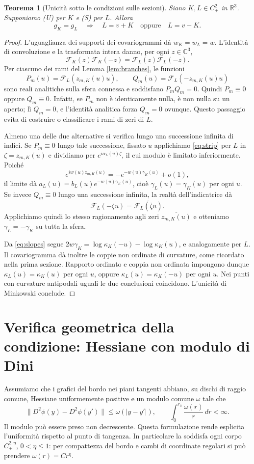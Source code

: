 \documentclass[11pt,a4paper]{article}
\newtheorem{theorem}{Teorema}
\theoremstyle{remark}
\newcommand{\R}{\mathbb R}
\begin{document}
\begin{theorem}[Unicità sotto le condizioni sulle sezioni]\label{thm:sectionunique}
Siano $K,L\in C^2_+$ in $\R^3$. Supponiamo (U) per $K$ e (S) per $L$.
Allora
\[
g_K=g_L\quad\Longrightarrow\quad L=v+K\quad\text{oppure}\quad L=v-K.
\]
\end{theorem}
\begin{proof}
L'uguaglianza dei supporti dei covariogrammi dà $w_K=w_L=w$.
L'identità di convoluzione e la trasformata intera danno, per ogni
$z\in\mathbb C^3$,
\[
\mathcal F_K(z)\mathcal F_K(-z)=\mathcal F_L(z)\mathcal F_L(-z).
\]
Per ciascuno dei rami del Lemma \ref{lem:branches}, le funzioni
\[
P_m(u)=\mathcal F_L(z_{m,K}(u)u),\qquad
Q_m(u)=\mathcal F_L(-z_{m,K}(u)u)
\]
sono reali analitiche sulla sfera connessa e soddisfano $P_mQ_m=0$.
Quindi $P_m\equiv0$ oppure $Q_m\equiv0$. Infatti, se $P_m$ non è
identicamente nulla, è non nulla su un aperto; lì $Q_m=0$, e l'identità
analitica forza $Q_m=0$ ovunque. Questo passaggio evita di costruire o
classificare i rami di zeri di $L$.

Almeno una delle due alternative si verifica lungo una successione
infinita di indici. Se $P_m\equiv0$ lungo tale successione, fissato $u$
applichiamo \eqref{eq:strip} per $L$ in $\zeta=z_{m,K}(u)$ e dividiamo
per $e^{i\alpha_L(u)\zeta}$, il cui modulo è limitato inferiormente.
Poiché
\[
e^{iw(u)z_{m,K}(u)}=-e^{-w(u)\gamma_K(u)}+o(1),
\]
il limite dà $a_L(u)=b_L(u)e^{-w(u)\gamma_K(u)}$, cioè
$\gamma_L(u)=\gamma_K(u)$ per ogni $u$.
Se invece $Q_m\equiv0$ lungo una successione infinita, la realtà
dell'indicatrice dà
\[
\mathcal F_L(-\zeta u)=\overline{\mathcal F_L(\overline\zeta u)}.
\]
Applichiamo quindi lo stesso ragionamento agli zeri
$\overline{z_{m,K}(u)}$ e otteniamo $\gamma_L=-\gamma_K$ su tutta la sfera.

Da \eqref{eq:slopes} segue
$2w\gamma_K=\log\kappa_K(-u)-\log\kappa_K(u)$, e analogamente per $L$.
Il covariogramma dà inoltre le coppie non ordinate di curvature,
come ricordato nella prima sezione. Rapporto ordinato e coppia non
ordinata impongono dunque $\kappa_L(u)=\kappa_K(u)$ per ogni $u$, oppure
$\kappa_L(u)=\kappa_K(-u)$ per ogni $u$. Nei punti con curvature
antipodali uguali le due conclusioni coincidono. L'unicità di Minkowski
conclude.
\end{proof}

\section{Verifica geometrica della condizione: Hessiane con modulo di Dini}
\label{sec:dini}
Assumiamo che i grafici del bordo nei piani tangenti abbiano, su dischi
di raggio comune, Hessiane uniformemente positive e un modulo comune
$\omega$ tale che
\begin{equation}\label{eq:dini}
\|D^2\phi(y)-D^2\phi(y')\|\leq\omega(|y-y'|),\qquad
\int_0^{r_0}\frac{\omega(r)}r\,dr<\infty.
\end{equation}
Il modulo può essere preso non decrescente. Questa formulazione rende
esplicita l'uniformità rispetto al punto di tangenza. In particolare la
soddisfa ogni corpo $C^{2,\eta}_+$, $0<\eta\leq1$: per compattezza del
bordo e cambi di coordinate regolari si può prendere $\omega(r)=Cr^\eta$.
\end{document}
